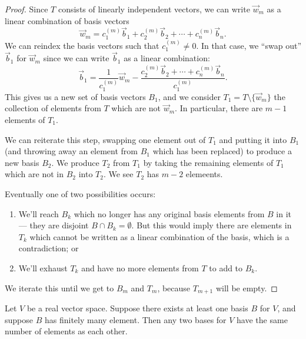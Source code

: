 \begin{proof}
Since $T$ consists of linearly independent vectors, we can write
$\vec{w}_{m}$ as a linear combination of basis vectors
\begin{equation}
\vec{w}_{m} = c^{(m)}_{1}\vec{b}_{1}+c^{(m)}_{2}\vec{b}_{2}+\cdots+c^{(m)}_{n}\vec{b}_{n}.
\end{equation}
We can reindex the basis vectors such that $c^{(m)}_{1}\neq0$. In that
case, we ``swap out'' $\vec{b}_{1}$ for $\vec{w}_{m}$ since we can write
$\vec{b}_{1}$ as a linear combination:
\begin{equation}
\vec{b}_{1}=\frac{1}{c^{(m)}_{1}}\vec{w}_{m} - \frac{c^{(m)}_{2}\vec{b}_{2}+\cdots+c^{(m)}_{n}\vec{b}_{n}}{c^{(m)}_{1}}.
\end{equation}
This gives us a new set of basis vectors $B_{1}$, and we consider $T_{1}=T\setminus\{\vec{w}_{m}\}$
the collection of elements from $T$ which are not $\vec{w}_{m}$. In
particular, there are $m-1$ elements of $T_{1}$.

We can reiterate this step, swapping one element out of $T_{1}$ and
putting it into $B_{1}$ (and throwing away an element from $B_{1}$ which
has been replaced) to produce a new basis $B_{2}$. We produce $T_{2}$
from $T_{1}$ by taking the remaining elements of $T_{1}$ which are not
in $B_{2}$ into $T_{2}$. We see $T_{2}$ has $m-2$ elemeents.

Eventually one of two possibilities occurs:
\begin{enumerate}
\item We'll reach $B_{k}$ which no longer has any original basis
  elements from $B$ in it --- they are disjoint $B\cap B_{k}=\emptyset$.
  But this would imply there are elements in $T_{k}$ which cannot be
  written as a linear combination of the basis, which is a
  contradiction; or
\item We'll exhaust $T_{k}$ and have no more elements from $T$ to add to $B_{k}$.
\end{enumerate}
We iterate this until we get to $B_{m}$ and $T_{m}$, because $T_{m+1}$
will be empty.
\end{proof}

\begin{theorem}
Let $V$ be a real vector space. Suppose there exists at least one basis
$B$ for $V$, and suppose $B$ has finitely many element.
Then any two bases for $V$ have the same number of elements as each other.
\end{theorem}

